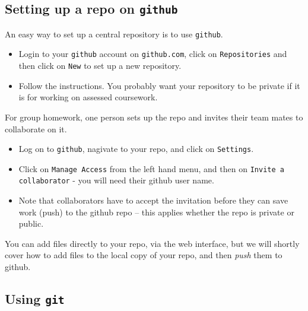 \documentclass[10pt] {article}
\theoremstyle{definition}
\begin{document}
\subsection{Setting up a repo on {\tt github}}

An easy way to set up a central repository is to use {\tt github}.  
\begin{itemize}
\item Login to your {\tt github} account on {\tt github.com}, click on {\tt Repositories} and then click on {\tt New} to set up a new repository.
\item Follow the instructions. You probably want your repository to be private if it is for working on assessed coursework.
\end{itemize}
For group homework, one person sets up the repo and invites their team mates to collaborate on it. 
\begin{itemize}
\item Log on to {\tt github}, nagivate to your repo, and click on {\tt Settings}.
\item Click on {\tt Manage Access} from the left hand menu, and then on {\tt Invite a collaborator} - you will need their github user name. 
\item Note that collaborators have to accept the invitation before they can save work (push) to the github repo -- this applies whether the repo is private or public. 
\end{itemize}
You can add files directly to your repo, via the web interface, but we will shortly cover how to add files to the local copy of your repo, and then {\em push} them to github. 

\subsection{Using {\tt git}}
\end{document}
